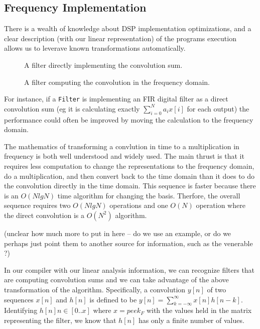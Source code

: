 \subsection{Frequency Implementation}
There is a wealth of knowledge about DSP implementation optimizations, 
and a clear description (with our linear representation) of the programs execution
allows us to leverave known transformations automatically. 

\begin{figure}
\center
\epsfxsize=2.0in
\caption{A filter directly implementing the convolution sum.}
\label{fig:frequency-conversion-convolution}
\end{figure}

\begin{figure}
\center
\epsfxsize=2.0in
\caption{A filter computing the convolution in the frequency domain.}
\label{fig:frequency-conversion-frequency}
\end{figure}

For instance, if a {\tt Filter} is implementing an FIR digital filter as a direct 
convolution sum (eg it is calculating exactly $\sum_{i=0}^{N}a_ix[i]$ for each output)
the performance could often be improved by moving the calculation to the frequency
domain. 

The mathematics of transforming a convlution in time to a multiplication in frequency 
is both well understood and widely used. The main thrust is that it requires less
computation to change the representations to the frequency domain,
do a multiplication, and then convert back to the time domain than it does to do the
convolution directly in the time domain. This sequence is faster because there is
an $O(N lg N)$ time algorithm for changing the basis. Therfore, the overall sequence
requires two $O(N lg N)$ operations and one $O(N)$ operation where the direct 
convolution is a $O(N^2)$ algorithm.

(unclear how much more to put in here -- do we use an example, or do we perhaps
just point them to another source for information, such as the venerable
\cite{oppehneim-discrete}?)

In our compiler with our linear analysis information, we can recognize filters that are
computing convolution sums and we can take advantage of the above transformation of the
algorithm. Specifically, a convolution $y[n]$ of two sequences  $x[n]$ and $h[n]$ is defined to be
$y[n] = \sum_{k=-\infty}^{\infty}x[n]h[n-k]$. Identifying
$h[n] n\in[0..x]$ where $x=peek_F$ with the values held in the matrix representing the filter, 
we know that $h[n]$ has only a finite number of values. 

